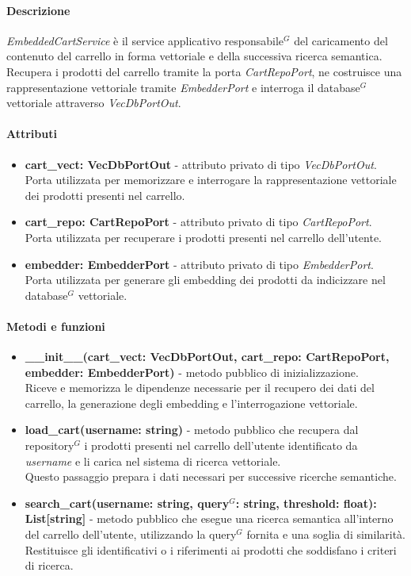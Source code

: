 \paragraph{Descrizione}
\textit{EmbeddedCartService} \`e il service applicativo responsabile$^G$ del caricamento del contenuto del carrello in forma vettoriale e della successiva ricerca semantica.\\
Recupera i prodotti del carrello tramite la porta \textit{CartRepoPort}, ne costruisce una rappresentazione vettoriale tramite \textit{EmbedderPort} e interroga il database$^G$ vettoriale attraverso \textit{VecDbPortOut}.

\paragraph{Attributi}
\begin{itemize}
	\item \textbf{cart\_vect: VecDbPortOut} - attributo privato di tipo \textit{VecDbPortOut}.\\
	Porta utilizzata per memorizzare e interrogare la rappresentazione vettoriale dei prodotti presenti nel carrello.
	\item \textbf{cart\_repo: CartRepoPort} - attributo privato di tipo \textit{CartRepoPort}.\\
	Porta utilizzata per recuperare i prodotti presenti nel carrello dell'utente.
	\item \textbf{embedder: EmbedderPort} - attributo privato di tipo \textit{EmbedderPort}.\\
	Porta utilizzata per generare gli embedding dei prodotti da indicizzare nel database$^G$ vettoriale.
\end{itemize}

\paragraph{Metodi e funzioni}
\begin{itemize}
	\item \textbf{\_\_init\_\_(cart\_vect: VecDbPortOut, cart\_repo: CartRepoPort, embedder: EmbedderPort)} - metodo pubblico di inizializzazione.\\
	Riceve e memorizza le dipendenze necessarie per il recupero dei dati del carrello, la generazione degli embedding e l'interrogazione vettoriale.
	\item \textbf{load\_cart(username: string)} - metodo pubblico che recupera dal repository$^G$ i prodotti presenti nel carrello dell'utente identificato da \textit{username} e li carica nel sistema di ricerca vettoriale.\\
	Questo passaggio prepara i dati necessari per successive ricerche semantiche.
	\item \textbf{search\_cart(username: string, query$^G$: string, threshold: float): List[string]} - metodo pubblico che esegue una ricerca semantica all'interno del carrello dell'utente, utilizzando la query$^G$ fornita e una soglia di similarità.\\
	Restituisce gli identificativi o i riferimenti ai prodotti che soddisfano i criteri di ricerca.
\end{itemize}

